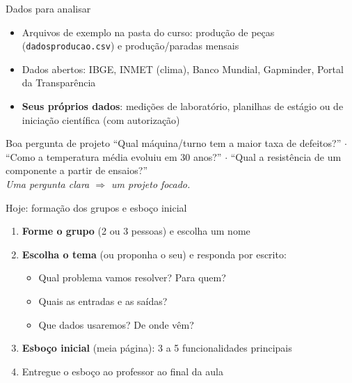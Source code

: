 \documentclass[aspectratio=169,10pt,t]{beamer}
\begin{document}
\begin{frame}{Dados para analisar}
  \begin{itemize}
    \item Arquivos de exemplo na pasta do curso: produção de peças (\texttt{dadosproducao.csv}) e produção/paradas mensais
    \item Dados abertos: IBGE, INMET (clima), Banco Mundial, Gapminder, Portal da Transparência
    \item \textbf{Seus próprios dados}: medições de laboratório, planilhas de estágio ou de iniciação científica (com autorização)
  \end{itemize}
  \begin{block}{Boa pergunta de projeto}
    ``Qual máquina/turno tem a maior taxa de defeitos?'' \(\cdot\) ``Como a temperatura média evoluiu em 30 anos?'' \(\cdot\) ``Qual a resistência de um componente a partir de ensaios?''\\
    \small\emph{Uma pergunta clara \(\Rightarrow\) um projeto focado.}
  \end{block}
\end{frame}

\begin{frame}{Hoje: formação dos grupos e esboço inicial}
  \begin{enumerate}
    \item \textbf{Forme o grupo} (2 ou 3 pessoas) e escolha um nome
    \item \textbf{Escolha o tema} (ou proponha o seu) e responda por escrito:
    \begin{itemize}\small
      \item Qual problema vamos resolver? Para quem?
      \item Quais as entradas e as saídas?
      \item Que dados usaremos? De onde vêm?
    \end{itemize}
    \item \textbf{Esboço inicial} (meia página): 3 a 5 funcionalidades principais
    \item Entregue o esboço ao professor ao final da aula
  \end{enumerate}
\end{frame}
\end{document}
